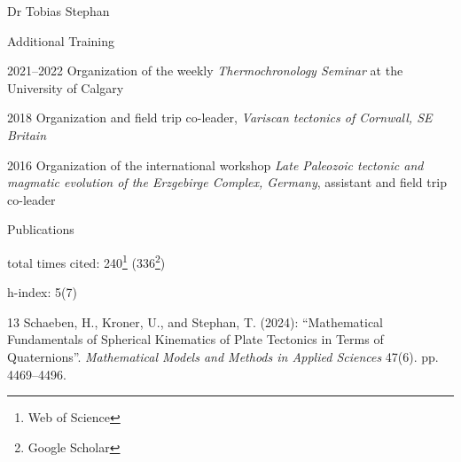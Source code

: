 \documentclass[10pt, paper=letter]{scrartcl} %
\begin{document}
\begin{cv}{Dr Tobias Stephan}
\begin{cvlist}{Additional Training}
\item[2021--2022] Organization of the weekly \textit{Thermochronology Seminar} at the University of Calgary
    \item[2018] Organization and field trip co-leader, \textit{Variscan tectonics of Cornwall, SE Britain}
    \item[2016] Organization of the international workshop \textit{Late Paleozoic tectonic and magmatic evolution of the Erzgebirge Complex, Germany}, assistant and field trip co-leader
\end{cvlist}

\begin{cvlist}{Publications}
\item[total times cited:] 240\footnote[1]{Web of Science} (336\footnote[2]{Google Scholar})
\item[h-index:] 5\footnotemark[1] (7\footnotemark[2])
    \item[13] Schaeben, H., Kroner, U., and Stephan, T. (2024): \enquote{Mathematical Fundamentals of Spherical Kinematics of Plate Tectonics in Terms of Quaternions}. \textit{Mathematical Models and Methods in Applied Sciences} 47(6). pp. 4469--4496. 


\end{cvlist}
\end{cv}
\end{document}
